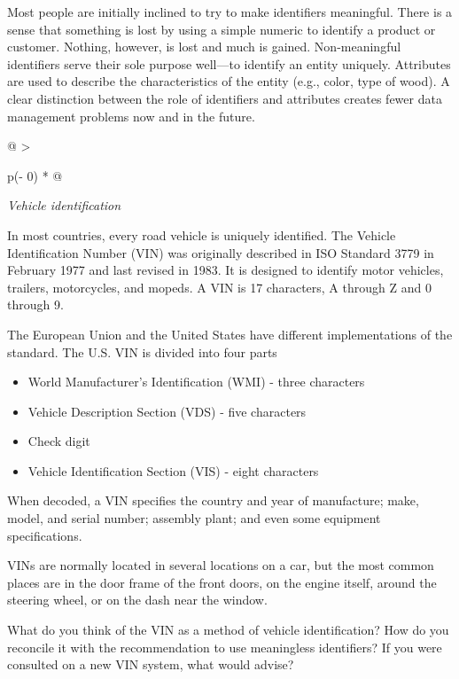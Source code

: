 \documentclass[
]{article}
\begin{document}
Most people are initially inclined to try to make identifiers
meaningful. There is a sense that something is lost by using a simple
numeric to identify a product or customer. Nothing, however, is lost and
much is gained. Non-meaningful identifiers serve their sole purpose
well---to identify an entity uniquely. Attributes are used to describe
the characteristics of the entity (e.g., color, type of wood). A clear
distinction between the role of identifiers and attributes creates fewer
data management problems now and in the future.

\begin{longtable}[]{@{}
  >{\raggedright\arraybackslash}p{(\columnwidth - 0\tabcolsep) * }@{}}
\toprule
\endhead
\begin{minipage}[t]{\linewidth}\raggedright
\emph{Vehicle identification}

In most countries, every road vehicle is uniquely identified. The
Vehicle Identification Number (VIN) was originally described in ISO
Standard 3779 in February 1977 and last revised in 1983. It is
designed to identify motor vehicles, trailers, motorcycles, and
mopeds. A VIN is 17 characters, A through Z and 0 through 9.

The European Union and the United States have different
implementations of the standard. The U.S. VIN is divided into four
parts

\begin{itemize}
\item
  World Manufacturer's Identification (WMI) - three characters
\item
  Vehicle Description Section (VDS) - five characters
\item
  Check digit
\item
  Vehicle Identification Section (VIS) - eight characters
\end{itemize}

When decoded, a VIN specifies the country and year of manufacture;
make, model, and serial number; assembly plant; and even some
equipment specifications.

VINs are normally located in several locations on a car, but the
most common places are in the door frame of the front doors, on the
engine itself, around the steering wheel, or on the dash near the
window.

What do you think of the VIN as a method of vehicle identification?
How do you reconcile it with the recommendation to use meaningless
identifiers? If you were consulted on a new VIN system, what would
advise?
\end{minipage} \\
\bottomrule
\end{longtable}
\end{document}
